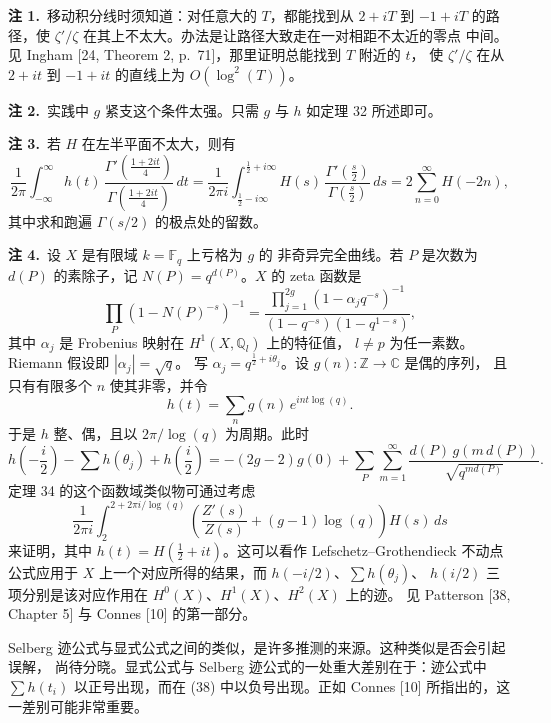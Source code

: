 \par\medskip\noindent\textbf{注 1.}\ 移动积分线时须知道：对任意大的 $T$，都能找到从 $2+iT$
到 $-1+iT$ 的路径，使 $\zeta'/\zeta$ 在其上不太大。办法是让路径大致走在一对相距不太近的零点
中间。见 Ingham [24, Theorem 2, p.\ 71]，那里证明总能找到 $T$ 附近的 $t$，
使 $\zeta'/\zeta$ 在从 $2+it$ 到 $-1+it$ 的直线上为 $O(\log^{2}(T))$。

\par\medskip\noindent\textbf{注 2.}\ 实践中 $g$ 紧支这个条件太强。只需 $g$ 与 $h$
如定理 32 所述即可。

\par\medskip\noindent\textbf{注 3.}\ 若 $H$ 在左半平面不太大，则有
\[
\frac{1}{2\pi}\int_{-\infty}^{\infty}h(t)\,
\frac{\Gamma'\!\left(\frac{1+2it}{4}\right)}{\Gamma\!\left(\frac{1+2it}{4}\right)}\,dt
=\frac{1}{2\pi i}\int_{\frac12-i\infty}^{\frac12+i\infty}H(s)\,
\frac{\Gamma'\!\left(\frac{s}{2}\right)}{\Gamma\!\left(\frac{s}{2}\right)}\,ds
=2\sum_{n=0}^{\infty}H(-2n),
\]
其中求和跑遍 $\Gamma(s/2)$ 的极点处的留数。

\par\medskip\noindent\textbf{注 4.}\ 设 $X$ 是有限域 $k=\mathbb{F}_{q}$ 上亏格为 $g$ 的
非奇异完全曲线。若 $P$ 是次数为 $d(P)$ 的素除子，记 $N(P)=q^{d(P)}$。$X$ 的 zeta 函数是
\[
\prod_{P}(1-N(P)^{-s})^{-1}
=\frac{\prod_{j=1}^{2g}(1-\alpha_{j}q^{-s})^{-1}}{(1-q^{-s})(1-q^{1-s})},
\]
其中 $\alpha_{j}$ 是 Frobenius 映射在 $H^{1}(X,\mathbb{Q}_{l})$ 上的特征值，
$l\neq p$ 为任一素数。Riemann 假设即 $|\alpha_{j}|=\sqrt{q}$。
写 $\alpha_{j}=q^{\frac12+i\theta_{j}}$。设 $g(n):\mathbb{Z}\to\mathbb{C}$ 是偶的序列，
且只有有限多个 $n$ 使其非零，并令
\[
h(t)=\sum_{n}g(n)\,e^{int\log(q)} .
\]
于是 $h$ 整、偶，且以 $2\pi/\log(q)$ 为周期。此时
\[
h\!\left(-\frac{i}{2}\right)-\sum h(\theta_{j})+h\!\left(\frac{i}{2}\right)
=-(2g-2)g(0)+\sum_{P}\sum_{m=1}^{\infty}
\frac{d(P)\,g(m\,d(P))}{\sqrt{q^{md(P)}}} .
\]
定理 34 的这个函数域类似物可通过考虑
\[
\frac{1}{2\pi i}\int_{2}^{2+2\pi i/\log(q)}
\left(\frac{Z'(s)}{Z(s)}+(g-1)\log(q)\right)H(s)\,ds
\]
来证明，其中 $h(t)=H\left(\frac12+it\right)$。这可以看作 Lefschetz--Grothendieck
不动点公式应用于 $X$ 上一个对应所得的结果，而 $h(-i/2)$、$\sum h(\theta_{j})$、
$h(i/2)$ 三项分别是该对应作用在 $H^{0}(X)$、$H^{1}(X)$、$H^{2}(X)$ 上的迹。
见 Patterson [38, Chapter 5] 与 Connes [10] 的第一部分。

Selberg 迹公式与显式公式之间的类似，是许多推测的来源。这种类似是否会引起误解，
尚待分晓。显式公式与 Selberg 迹公式的一处重大差别在于：迹公式中 $\sum h(t_{i})$
以正号出现，而在 (38) 中以负号出现。正如 Connes [10] 所指出的，这一差别可能非常重要。

